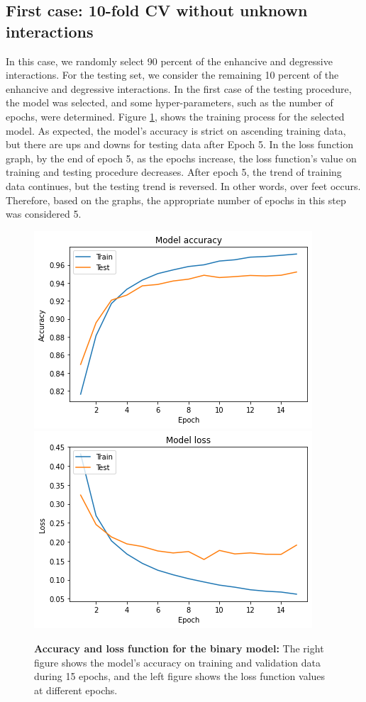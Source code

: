 \documentclass{bmcart}
\begin{document}
\subsection*{First case: 10-fold CV without unknown interactions}
In this case, we randomly select 90 percent of the enhancive and degressive interactions. For the testing set, we consider the remaining 10 percent of the enhancive and degressive interactions. In the first case of the testing procedure,  the model was selected, and some hyper-parameters, such as the number of epochs, were determined. Figure \ref{ModelSelection}, shows the training process for the selected model. As expected, the model's accuracy is strict on ascending training data, but there are ups and downs for testing data after Epoch 5. In the loss function graph, by the end of epoch 5, as the epochs increase, the loss function's value on training and testing procedure decreases. After epoch 5, the trend of training data continues, but the testing trend is reversed. In other words, over feet occurs. Therefore, based on the graphs, the appropriate number of epochs in this step was considered 5.
\begin{figure}[!h]
	\begin{minipage}{1\linewidth} 
		\includegraphics[width=.48\textwidth]{ModelSelection/selectedModelAcc.png} 
		\includegraphics[width=.48\textwidth]{ModelSelection/selectedModelLoss.png} 
	\end{minipage}
	\caption{\textbf{Accuracy and loss function for the binary model:} The right figure shows the model's accuracy on training and validation data during 15 epochs, and the left figure shows the loss function values at different epochs.}
	\label{ModelSelection}
\end{figure}
\end{document}
